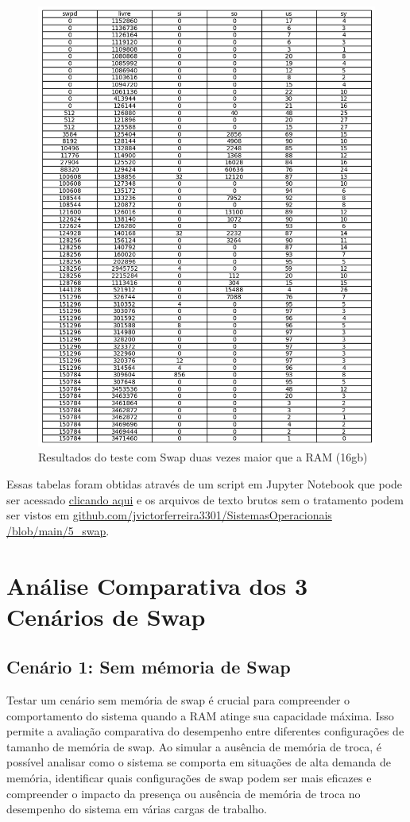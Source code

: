\documentclass[
	12pt,				%
	openright,			%
	oneside,			%
	a4paper,			%
	chapter=TITLE,		%
	english,			%
	french,				%
	spanish,			%
	brazil				%
	]{abntex2}
\theoremstyle{definition}
\begin{document}
\begin{figure}[H]
	\centering
	\includegraphics[width=1.0\textwidth]{swap16gb.png}
	\caption{Resultados do teste com Swap duas vezes maior que a RAM (16gb)}
	\label{fig:swap16}
\end{figure}

Essas tabelas foram obtidas através de um script em Jupyter Notebook que pode ser acessado 
\href{https://github.com/jvictorferreira3301/Sistemas_Operacionais/blob/main/5_swap/swap.sh}{clicando aqui} 
e os arquivos de texto brutos sem o tratamento podem ser vistos em  \href{https://github.com/jvictorferreira3301/Sistemas_Operacionais/blob/main/5_swap}{github.com/jvictorferreira3301/SistemasOperacionais
/blob/main/5\_swap}.

\section{Análise Comparativa dos 3 Cenários de Swap}
\subsection{Cenário 1: Sem mémoria de Swap}
Testar um cenário sem memória de swap é crucial para compreender o comportamento do sistema quando a RAM atinge sua capacidade máxima. 
Isso permite a avaliação comparativa do desempenho entre diferentes configurações de tamanho de memória de swap. Ao simular a ausência de memória de troca,
é possível analisar como o sistema se comporta em situações de alta demanda de memória, identificar quais configurações de swap podem ser mais
eficazes e compreender o impacto da presença ou ausência de memória de troca no desempenho do sistema em várias cargas de trabalho.
\end{document}

